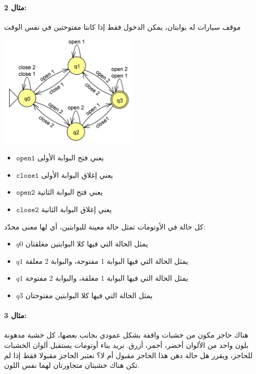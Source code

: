 \documentclass[12pt]{article}
\begin{document}
\paragraph{مثال 2:} موقف سيارات له بوابتان، يمكن الدخول فقط إذا كانتا مفتوحتين في نفس الوقت
\begin{center}
\includegraphics[width=0.5\textwidth]{../../../images/DFAs/02_two_gates_to_open_dfa.png}
\end{center}

\begin{itemize}
    \item $\mathtt{open 1}$ يعني فتح البوابة الأولى
    \item $\mathtt{close 1}$ يعني إغلاق البوابة الأولى
    \item $\mathtt{open 2}$ يعني فتح البوابة الثانية
    \item $\mathtt{close 2}$ يعني إغلاق البوابة الثانية
\end{itemize}

كل حالة في الأوتومات تمثل حالة معينة للبوابتين، أي لها معنى محدّد:
\begin{itemize}
    \item $q0$ يمثل الحالة التي فيها كلا البوابتين مغلقتان
    \item $q1$ يمثل الحالة التي فيها البوابة 1 مفتوحة، والبوابة 2 مغلقة
    \item $q1$ يمثل الحالة التي فيها البوابة 1 مغلقة، والبوابة 2 مفتوحة
    \item $q3$ يمثل الحالة التي فيها كلا البوابتين مفتوحتان
\end{itemize}


\paragraph{مثال 3:} هناك حاجز مكون من خشبات واقفة بشكل عمودي بجانب بعضها، كل خشبة مدهونة بلون واحد من الألوان أخضر، أحمر، أزرق. نريد بناء أوتومات يستقبل ألوان الخشبات للحاجز، ويقرر هل حالة دهن هذا الحاجز مقبول أم لا؟
نعتبر الحاجز مقبولا فقط إذا لم تكن هناك خشبتان متجاورتان لهما نفس اللون.
\end{document}
